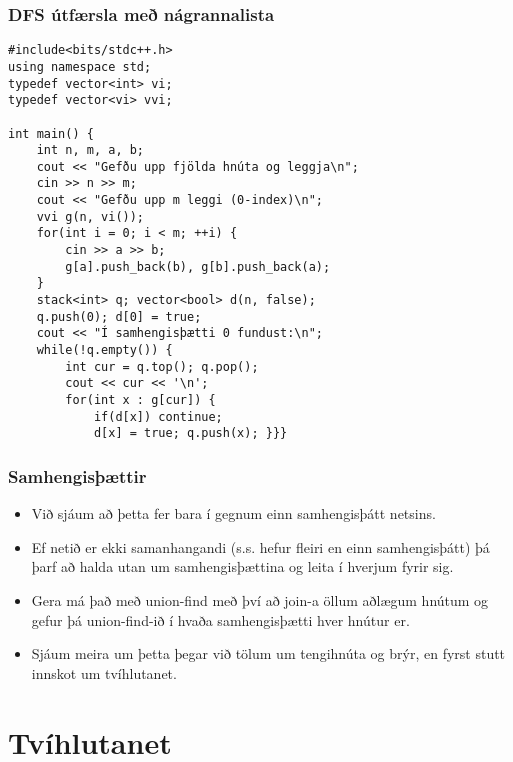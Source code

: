 \documentclass{beamer}
\begin{document}
\begin{frame}[fragile]
\frametitle{DFS útfærsla með nágrannalista}

\begin{scriptsize}
\begin{verbatim}
#include<bits/stdc++.h>
using namespace std;
typedef vector<int> vi;
typedef vector<vi> vvi;

int main() {
    int n, m, a, b;
    cout << "Gefðu upp fjölda hnúta og leggja\n";
    cin >> n >> m;
    cout << "Gefðu upp m leggi (0-index)\n";
    vvi g(n, vi());
    for(int i = 0; i < m; ++i) {
        cin >> a >> b;
        g[a].push_back(b), g[b].push_back(a);
    }
    stack<int> q; vector<bool> d(n, false);
    q.push(0); d[0] = true;
    cout << "Í samhengisþætti 0 fundust:\n";
    while(!q.empty()) {
        int cur = q.top(); q.pop();
        cout << cur << '\n'; 
        for(int x : g[cur]) {
            if(d[x]) continue;
            d[x] = true; q.push(x); }}}
\end{verbatim}
\end{scriptsize}

\end{frame}

\begin{frame}
\frametitle{Samhengisþættir}

\begin{itemize}

\item<1-> Við sjáum að þetta fer bara í gegnum einn samhengisþátt netsins.

\item<2-> Ef netið er ekki samanhangandi (s.s. hefur fleiri en einn samhengisþátt) þá þarf að halda utan um samhengisþættina og leita í hverjum fyrir sig.

\item<3-> Gera má það með union-find með því að join-a öllum aðlægum hnútum og gefur þá union-find-ið í hvaða samhengisþætti hver hnútur er.

\item<4-> Sjáum meira um þetta þegar við tölum um tengihnúta og brýr, en fyrst stutt innskot um tvíhlutanet.

\end{itemize}

\end{frame}

\section[Tvíhlutanet]{Tvíhlutanet}
\end{document}
